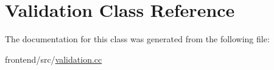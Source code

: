 \hypertarget{classValidation}{\section{Validation Class Reference}
\label{classValidation}
}


The documentation for this class was generated from the following file\-:\begin{DoxyCompactItemize}
\item 
frontend/src/\hyperlink{validation_8cc}{validation.\-cc}\end{DoxyCompactItemize}
